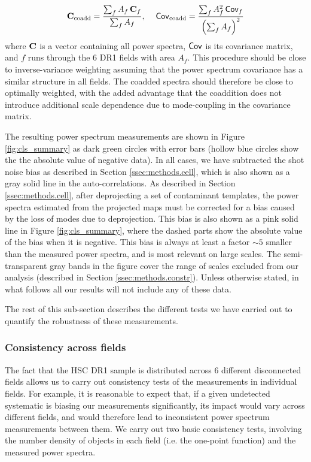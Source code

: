 \documentclass[a4paper,11pt]{article}
\begin{document}
      \begin{equation}
        {\bf C}_{\rm coadd}=\frac{\sum_f A_f\,{\bf C}_f}{\sum_f A_f}, \hspace{12pt}{\sf Cov}_{\rm coadd}=\frac{\sum_f A_f^2\,{\sf Cov}_f}{\left(\sum_f A_f\right)^2}
      \end{equation}
      where ${\bf C}$ is a vector containing all power spectra, ${\sf Cov}$ is its covariance matrix, and $f$ runs through the 6 DR1 fields with area $A_f$. This procedure should be close to inverse-variance weighting assuming that the power spectrum covariance has a similar structure in all fields. The coadded spectra should therefore be close to optimally weighted, with the added advantage that the coaddition does not introduce additional scale dependence due to mode-coupling in the covariance matrix.
      
      The resulting power spectrum measurements are shown in Figure \ref{fig:cls_summary} as dark green circles with error bars (hollow blue circles show the the absolute value of negative data). In all cases, we have subtracted the shot noise bias as described in Section \ref{ssec:methods.cell}, which is also shown as a gray solid line in the auto-correlations. As described in Section \ref{ssec:methods.cell}, after deprojecting a set of contaminant templates, the power spectra estimated from the projected maps must be corrected for a bias caused by the loss of modes due to deprojection. This bias is also shown as a pink solid line in Figure \ref{fig:cls_summary}, where the dashed parts show the absolute value of the bias when it is negative. This bias is always at least a factor $\sim5$ smaller than the measured power spectra, and is most relevant on large scales. The semi-transparent gray bands in the figure cover the range of scales excluded from our analysis (described in Section \ref{ssec:methods.constr}). Unless otherwise stated, in what follows all our results will not include any of these data.
      
      The rest of this sub-section describes the different tests we have carried out to quantify the robustness of these measurements.

    \subsubsection{Consistency across fields}\label{sssec:results.spectra.consistent}
      The fact that the HSC DR1 sample is distributed across 6 different disconnected fields allows us to carry out consistency tests of the measurements in individual fields. For example, it is reasonable to expect that, if a given undetected systematic is biasing our measurements significantly, its impact would vary across different fields, and would therefore lead to inconsistent power spectrum measurements between them. We carry out two basic consistency tests, involving the number density of objects in each field (i.e. the one-point function) and the measured power spectra.
      
\end{document}
